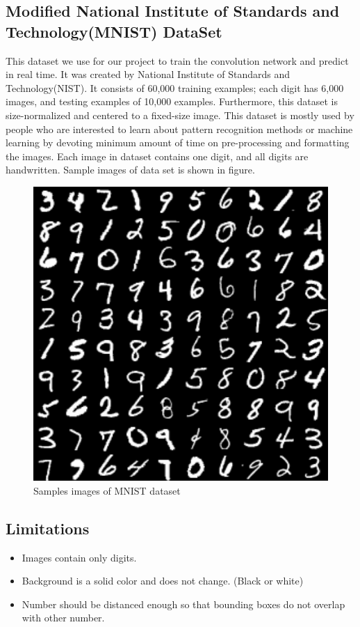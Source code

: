 \documentclass[12pt, letterpaper]{article}
\begin{document}
\subsection{Modified National Institute of Standards and Technology(MNIST) DataSet}

This dataset we use for our project to train the convolution network and predict in real time. It was created by National Institute of Standards and Technology(NIST). It consists of 60,000 training examples; each digit has 6,000 images, and testing examples of 10,000 examples. Furthermore, this dataset is size-normalized and centered to a fixed-size image. This dataset is mostly used by people who are interested to learn about pattern recognition methods or machine learning by devoting minimum amount of time on pre-processing and formatting the images. Each image in dataset contains one digit, and all digits are handwritten. Sample images of data set is shown in figure.

\begin{figure}[!h]
	\begin{center}	
		\includegraphics[scale = 0.5]{mnist-digits-small.png}
		\caption{ \cite{Classifying MNIST Digits} Samples images of MNIST dataset }
	\end{center}
\end{figure}  

\subsection{Limitations}
	\begin{itemize}
		\item Images contain only digits.
		\item Background is a solid color and does not change. (Black or white)
		\item Number should be distanced enough so that bounding boxes do not overlap with other number.
	\end{itemize}
\end{document}
